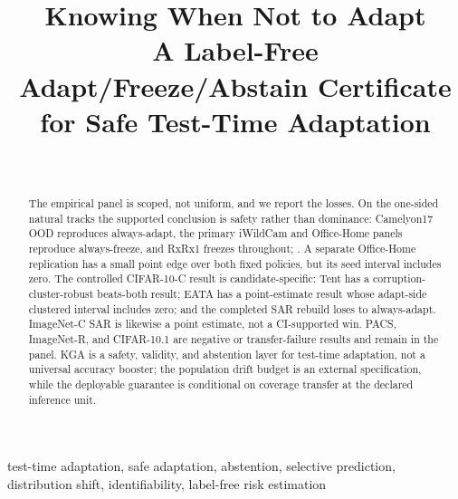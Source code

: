 \documentclass[conference]{IEEEtran}
\title{Knowing When Not to Adapt \\
A Label-Free Adapt/Freeze/Abstain Certificate for Safe Test-Time Adaptation}
\author{\IEEEauthorblockN{Anonymous Authors}\\
\IEEEauthorblockA{Paper under double-blind review}}
\theoremstyle{plain}
\theoremstyle{definition}
\begin{document}
\maketitle

\begin{abstract}


The empirical panel is scoped, not uniform, and we report the losses. On the one-sided natural
tracks the supported conclusion is safety rather than dominance: Camelyon17 OOD reproduces
always-adapt, the primary iWildCam and Office-Home panels reproduce always-freeze, and RxRx1 freezes
throughout; . A separate Office-Home replication has a small
point edge over both fixed policies, but its seed interval includes zero. The controlled
CIFAR-10-C result is candidate-specific: Tent has a corruption-cluster-robust beats-both result;
EATA has a point-estimate result whose adapt-side clustered interval includes zero; and the completed
SAR rebuild loses to always-adapt. ImageNet-C SAR is likewise a point estimate, not a CI-supported
win. PACS, ImageNet-R, and CIFAR-10.1 are negative or transfer-failure results and remain in the
panel. \textsc{KGA} is a safety, validity, and abstention layer for test-time adaptation, not a
universal accuracy booster; the population drift budget is an external specification, while the
deployable guarantee is conditional on coverage transfer at the declared inference unit.
\end{abstract}

\begin{IEEEkeywords}
test-time adaptation, safe adaptation, abstention, selective prediction, distribution shift, identifiability, label-free risk estimation
\end{IEEEkeywords}

\begin{center}
\end{center}
\end{document}
